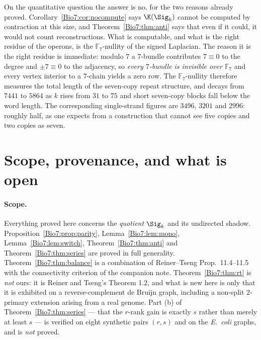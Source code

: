 On the quantitative question the answer is no, for the two reasons already proved.
Corollary~\ref{Bio7:cor:nocompute} says $\K(\Sig_k)$ cannot be computed by contraction at this
size, and Theorem~\ref{Bio7:thm:anti} says that even if it could, it would not count
reconstructions. What is computable, and what is the right residue of the operons, is the
$\mathbb{F}_7$-nullity of the signed Laplacian. The reason it is the right residue is
immediate: modulo $7$ a $7$-bundle contributes $7\equiv0$ to the degree and $\pm7\equiv0$ to
the adjacency, so \emph{every $7$-bundle is invisible over $\mathbb{F}_7$} and every vertex
interior to a $7$-chain yields a zero row. The $\mathbb{F}_7$-nullity therefore measures the
total length of the seven-copy repeat structure, and decays from $7441$ to $5864$ as $k$
rises from $31$ to $75$ and short seven-copy blocks fall below the word length. The
corresponding single-strand figures are $3496$, $3201$ and $2996$: roughly half, as one
expects from a construction that cannot see five copies and two copies as seven.

\section{Scope, provenance, and what is open}

\paragraph{Scope.} Everything proved here concerns the \emph{quotient} $\Sig_k$ and its
undirected shadow. Proposition~\ref{Bio7:prop:parity}, Lemma~\ref{Bio7:lem:mono},
Lemma~\ref{Bio7:lem:switch}, Theorem~\ref{Bio7:thm:anti} and Theorem~\ref{Bio7:thm:series} are proved in
full generality. Theorem~\ref{Bio7:thm:balance} is a combination of Reiner--Tseng
Prop.~11.4--11.5 with the connectivity criterion of the companion note. Theorem~\ref{Bio7:thm:rt}
is \emph{not} ours: it is Reiner and Tseng's Theorem 1.2, and what is new here is only that
it is exhibited on a reverse-complement de Bruijn graph, including a non-split $2$-primary
extension arising from a real genome. Part (b) of Theorem~\ref{Bio7:thm:series} --- that the
$r$-rank gain is exactly $s$ rather than merely at least $s$ --- is verified on eight
synthetic pairs $(r,s)$ and on the \emph{E.\ coli} graphs, and is \emph{not} proved.

